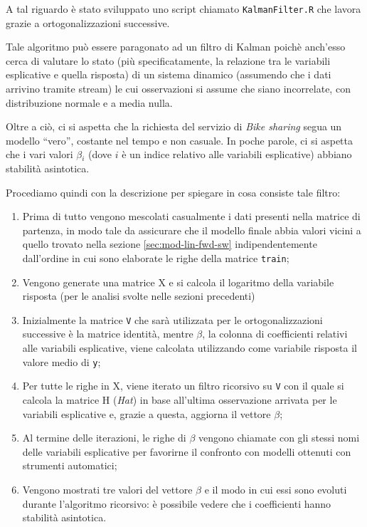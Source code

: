 A tal riguardo è stato sviluppato uno script chiamato \texttt{KalmanFilter.R}
che lavora grazie a ortogonalizzazioni successive.

Tale algoritmo può essere paragonato ad un filtro di Kalman poichè anch'esso
cerca di valutare lo stato (più specificatamente, la relazione tra le
variabili esplicative e quella risposta) di un sistema dinamico (assumendo che
i dati arrivino tramite stream) le cui osservazioni si assume che siano
incorrelate, con distribuzione normale e a media nulla.

Oltre a ciò, ci si aspetta che la richiesta del servizio di \emph{Bike sharing}
segua un modello ``vero'', costante nel tempo e non casuale. In poche parole,
ci si aspetta che i vari valori $ \beta{}_i $ (dove $i$ è un indice relativo
alle variabili esplicative) abbiano stabilità asintotica.

Procediamo quindi con la descrizione per spiegare in cosa consiste tale filtro:

\begin{enumerate}
\item Prima di tutto vengono mescolati casualmente i dati presenti nella
  matrice di partenza, in modo tale da assicurare che il modello finale abbia
  valori vicini a quello trovato nella sezione \ref{sec:mod-lin-fwd-sw}
  indipendentemente dall'ordine in cui sono elaborate le righe della matrice
  \texttt{train};
\item Vengono generate una matrice X e si calcola il logaritmo della variabile
  risposta (per le analisi svolte nelle sezioni precedenti)
\item Inizialmente la matrice \texttt{V} che sarà utilizzata per le
  ortogonalizzazioni successive è la matrice identità, mentre $ \beta{} $, la
  colonna di coefficienti relativi alle variabili esplicative, viene calcolata
  utilizzando come variabile risposta il valore medio di \texttt{y};
\item Per tutte le righe in X, viene iterato un filtro ricorsivo su \texttt{V}
  con il quale si calcola la matrice H (\emph{Hat}) in base all'ultima
  osservazione arrivata per le variabili esplicative e, grazie a questa,
  aggiorna il vettore $ \beta{} $;
\item Al termine delle iterazioni, le righe di $ \beta{} $ vengono chiamate
  con gli stessi nomi delle variabili esplicative per favorirne il confronto
  con modelli ottenuti con strumenti automatici;
\item Vengono mostrati tre valori del vettore $ \beta{} $ e il modo in cui essi
  sono evoluti durante l'algoritmo ricorsivo: è possibile vedere che i
  coefficienti hanno stabilità asintotica.
\end{enumerate}


